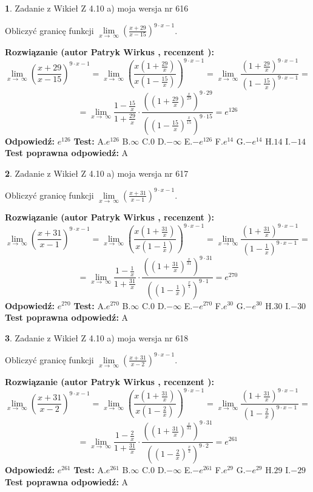 \documentclass[12pt, a4paper]{article}
\theoremstyle{definition} %
\newtheorem{zad}{}
\newcommand{\zadStart}[1]{\begin{zad}#1\newline}
\newcommand{\zadStop}{\end{zad}}
\newcommand{\rozwStart}[2]{\noindent \textbf{Rozwiązanie (autor #1 , recenzent #2): }\newline}
\newcommand{\rozwStop}{\newline}
\newcommand{\odpStart}{\noindent \textbf{Odpowiedź:}\newline}
\newcommand{\odpStop}{\newline}
\newcommand{\testStart}{\noindent \textbf{Test:}\newline}
\newcommand{\testStop}{\newline}
\newcommand{\kluczStart}{\noindent \textbf{Test poprawna odpowiedź:}\newline}
\newcommand{\kluczStop}{\newline}
\begin{document}
\zadStart{Zadanie z Wikieł Z 4.10 a) moja wersja nr 616}

Obliczyć granicę funkcji  $\lim\limits_{x\to\ \infty}(\frac{x+29}{x-15})^{9\cdot x-1}$.
\zadStop
\rozwStart{Patryk Wirkus}{}
$$\lim\limits_{x\to\ \infty}(\frac{x+29}{x-15})^{9\cdot x-1} = \lim\limits_{x\to\ \infty}(\frac{x(1+\frac{29}{x})}{x(1-\frac{15}{x})})^{9\cdot x-1}=\lim\limits_{x\to\ \infty}\frac{(1+\frac{29}{x})^{9\cdot x-1}}{(1-\frac{15}{x})^{9\cdot x-1}}=$$
$$=\lim\limits_{x\to\ \infty}\frac{1-\frac{15}{x}}{1+\frac{29}{x}}\cdot\frac{((1+\frac{29}{x})^{\frac{x}{29}})^{9\cdot29}}{((1-\frac{15}{x})^{\frac{x}{15}})^{9\cdot15}}=e^{126}$$
\rozwStop
\odpStart
$e^{126}$
\odpStop
\testStart
A.$e^{126}$ B.$\infty$ C.$0$ D.$-\infty$ E.$-e^{126}$
F.$e^{14}$ G.$-e^{14}$
H.$14$
I.$-14$
\testStop
\kluczStart
A
\kluczStop



\zadStart{Zadanie z Wikieł Z 4.10 a) moja wersja nr 617}

Obliczyć granicę funkcji  $\lim\limits_{x\to\ \infty}(\frac{x+31}{x-1})^{9\cdot x-1}$.
\zadStop
\rozwStart{Patryk Wirkus}{}
$$\lim\limits_{x\to\ \infty}(\frac{x+31}{x-1})^{9\cdot x-1} = \lim\limits_{x\to\ \infty}(\frac{x(1+\frac{31}{x})}{x(1-\frac{1}{x})})^{9\cdot x-1}=\lim\limits_{x\to\ \infty}\frac{(1+\frac{31}{x})^{9\cdot x-1}}{(1-\frac{1}{x})^{9\cdot x-1}}=$$
$$=\lim\limits_{x\to\ \infty}\frac{1-\frac{1}{x}}{1+\frac{31}{x}}\cdot\frac{((1+\frac{31}{x})^{\frac{x}{31}})^{9\cdot31}}{((1-\frac{1}{x})^{\frac{x}{1}})^{9\cdot1}}=e^{270}$$
\rozwStop
\odpStart
$e^{270}$
\odpStop
\testStart
A.$e^{270}$ B.$\infty$ C.$0$ D.$-\infty$ E.$-e^{270}$
F.$e^{30}$ G.$-e^{30}$
H.$30$
I.$-30$
\testStop
\kluczStart
A
\kluczStop



\zadStart{Zadanie z Wikieł Z 4.10 a) moja wersja nr 618}

Obliczyć granicę funkcji  $\lim\limits_{x\to\ \infty}(\frac{x+31}{x-2})^{9\cdot x-1}$.
\zadStop
\rozwStart{Patryk Wirkus}{}
$$\lim\limits_{x\to\ \infty}(\frac{x+31}{x-2})^{9\cdot x-1} = \lim\limits_{x\to\ \infty}(\frac{x(1+\frac{31}{x})}{x(1-\frac{2}{x})})^{9\cdot x-1}=\lim\limits_{x\to\ \infty}\frac{(1+\frac{31}{x})^{9\cdot x-1}}{(1-\frac{2}{x})^{9\cdot x-1}}=$$
$$=\lim\limits_{x\to\ \infty}\frac{1-\frac{2}{x}}{1+\frac{31}{x}}\cdot\frac{((1+\frac{31}{x})^{\frac{x}{31}})^{9\cdot31}}{((1-\frac{2}{x})^{\frac{x}{2}})^{9\cdot2}}=e^{261}$$
\rozwStop
\odpStart
$e^{261}$
\odpStop
\testStart
A.$e^{261}$ B.$\infty$ C.$0$ D.$-\infty$ E.$-e^{261}$
F.$e^{29}$ G.$-e^{29}$
H.$29$
I.$-29$
\testStop
\kluczStart
A
\kluczStop
\end{document}
